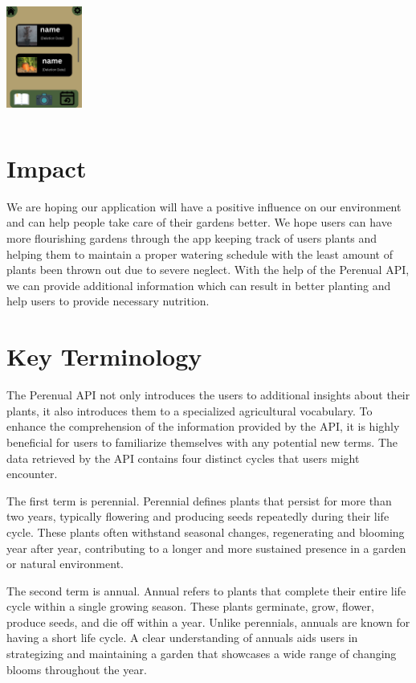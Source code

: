 \documentclass{sigchi}
\begin{document}
\includegraphics[width=2.5cm, height=4cm]{PlantHistory}

\section{Impact}
We are hoping our application will have a positive influence on our environment and can help people take care of their gardens better. We hope users can have more flourishing gardens through the app keeping track of users plants and helping them to maintain a proper watering schedule with the least amount of plants been thrown out due to severe neglect. With the help of the Perenual API, we can provide additional information which can result in better planting and help users to provide necessary nutrition.

\section{Key Terminology}
The Perenual API not only introduces the users to additional insights about their plants, it also introduces them to a specialized agricultural vocabulary. To enhance the comprehension of the information provided by the API, it is highly beneficial for users to familiarize themselves with any potential new terms. The data retrieved by the API contains four distinct cycles that users might encounter. 

The first term is perennial. Perennial defines plants that persist for more than two years, typically flowering and producing seeds repeatedly during their life cycle. These plants often withstand seasonal changes, regenerating and blooming year after year, contributing to a longer and more sustained presence in a garden or natural environment. 

 The second term is annual. Annual refers to plants that complete their entire life cycle within a single growing season. These plants germinate, grow, flower, produce seeds, and die off within a year. Unlike perennials, annuals are known for having a short life cycle. A clear understanding of annuals aids users in strategizing and maintaining a garden that showcases a wide range of changing blooms throughout the year.
\end{document}
